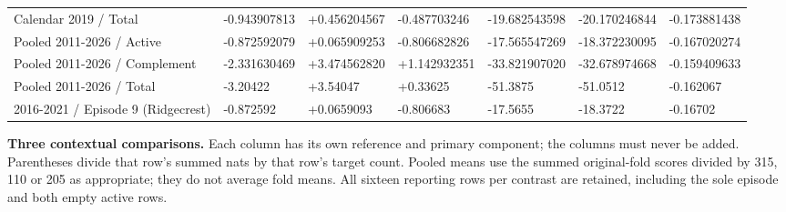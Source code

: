 \begin{longtable}
{}Calendar 2019 / Total & -0.943907813 & +0.456204567 & -0.487703246 & -19.682543598 & -20.170246844 & -0.173881438 \\
{}Pooled 2011-2026 / Active & -0.872592079 & +0.065909253 & -0.806682826 & -17.565547269 & -18.372230095 & -0.167020274 \\
{}Pooled 2011-2026 / Complement & -2.331630469 & +3.474562820 & +1.142932351 & -33.821907020 & -32.678974668 & -0.159409633 \\
{}Pooled 2011-2026 / Total & -3.20422 & +3.54047 & +0.33625 & -51.3875 & -51.0512 & -0.162067 \\
{}2016-2021 / Episode 9 (Ridgecrest) & -0.872592 & +0.0659093 & -0.806683 & -17.5655 & -18.3722 & -0.16702 \\
\end{longtable}\endgroup

\textbf{Three contextual comparisons.} Each column has its own reference and primary component; the columns must never be added. Parentheses divide that row's summed nats by that row's target count. Pooled means use the summed original-fold scores divided by 315, 110 or 205 as appropriate; they do not average fold means. All sixteen reporting rows per contrast are retained, including the sole episode and both empty active rows.

